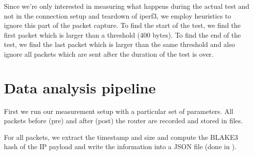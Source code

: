 Since we're only interested in measuring what happens during the actual test and not in the connection setup and teardown of iperf3, we employ heuristics to ignore this part of the packet capture.
To find the start of the test, we find the first packet which is larger than a threshold (400 bytes).
To find the end of the test, we find the last packet which is larger than the same threshold and also ignore all packets which are sent after the duration of the test is over.


\section{Data analysis pipeline}
\label{sect:data-analysis-pipeline}
First we run our measurement setup with a particular set of parameters.
All packets before (pre) and after (post) the router are recorded and stored in  files.

For all packets, we extract the timestamp and size and compute the BLAKE3 \cite{BLAKE3} hash of the IP payload and write the information into a JSON \cite{RFC8259} file (done in \mbox{}).

